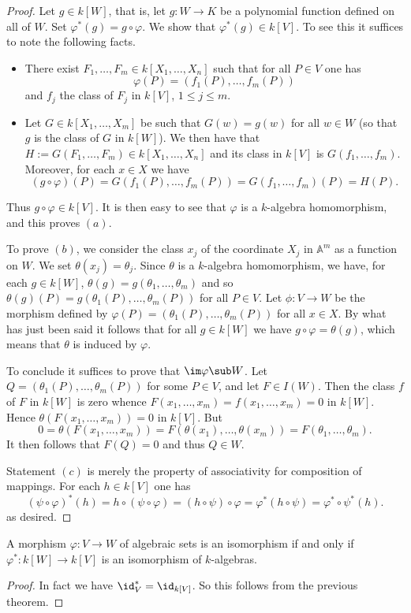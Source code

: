 \begin{proof}
Let $g\in k[W]$, that is, let $g:W\to K$ be a polynomial function defined on all of $W$. Set $\varphi^*(g)=g\circ\varphi$. We show that $\varphi^*(g)\in k[V]$. To see this it suffices to note the following facts.
\begin{itemize}
\item There exist $F_1,\dots,F_m\in k[X_1,\dots,X_n]$ such that for all $P\in V$ one has 
\[\varphi(P)=(f_1(P),\dots,f_m(P))\] 
and $f_j$ the class of $F_j$ in $k[V]$, $1\leq j\leq m$.
\item Let $G\in k[X_1,\dots,X_m]$ be such that $G(w)=g(w)$ for all $w\in W$ (so that $g$ is the class of $G$ in $k[W]$). We then have that $H:=G(F_1,\dots,F_m)\in k[X_1,\dots,X_n]$ and its class in $k[V]$ is $G(f_1,\dots,f_m)$. Moreover, for each $x\in X$ we have
\[(g\circ\varphi)(P)=G(f_1(P),\dots,f_m(P))=G(f_1,\dots,f_m)(P)=H(P).\]
\end{itemize}
Thus $g\circ\varphi\in k[V]$. It is then easy to see that $\varphi$ is a $k$-algebra homomorphism, and this proves $(a)$.\par
To prove $(b)$, we consider the class $x_j$ of the coordinate $X_j$ in $\mathbb{A}^m$ as a function on $W$. We set $\theta(x_j)=\theta_j$. Since $\theta$ is a $k$-algebra homomorphism, we have, for each $g\in k[W]$, $\theta(g)=g(\theta_1,\dots,\theta_m)$ and so $\theta(g)(P)=g(\theta_1(P),\dots,\theta_m(P))$ for all $P\in V$. Let $\phi:V\to W$ be the morphism defined by $\varphi(P)=(\theta_1(P),\dots,\theta_m(P))$ for all $x\in X$. By what has just been said it follows that for all $g\in k[W]$ we have $g\circ\varphi=\theta(g)$, which means that $\theta$ is induced by $\varphi$.\par
To conclude it suffices to prove that $\im\varphi\sub W$. Let $Q=(\theta_1(P),\dots,\theta_m(P))$ for some $P\in V$, and let $F\in I(W)$. Then the class $f$ of $F$ in $k[W]$ is zero whence $F(x_1,\dots,x_m)=f(x_1,\dots,x_m)=0$ in $k[W]$. Hence $\theta(F(x_1,\dots,x_m))=0$ in $k[V]$. But
\[0=\theta(F(x_1,\dots,x_m))=F(\theta(x_1),\dots,\theta(x_m))=F(\theta_1,\dots,\theta_m).\]
It then follows that $F(Q)=0$ and thus $Q\in W$.\par
Statement $(c)$ is merely the property of associativity for composition of mappings. For each $h\in k[V]$ one has
\[(\psi\circ\varphi)^*(h)=h\circ(\psi\circ\varphi)=(h\circ\psi)\circ\varphi=\varphi^*(h\circ\psi)=\varphi^*\circ\psi^*(h).\]
as desired.
\end{proof}
\begin{corollary}
A morphism $\varphi:V\to W$ of algebraic sets is an isomorphism if and only if $\varphi^*:k[W]\to k[V]$ is an isomorphism of $k$-algebras.
\end{corollary}
\begin{proof}
In fact we have $\id_V^*=\id_{k[V]}$. So this follows from the previous theorem.
\end{proof}
